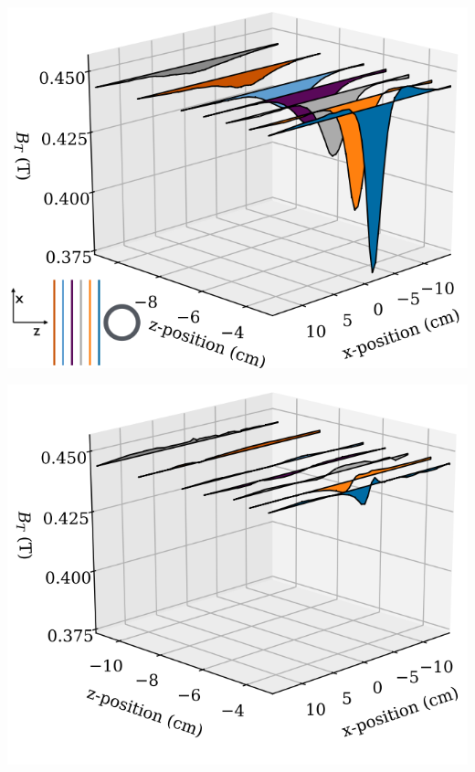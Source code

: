 \documentclass[landscape,a0paper,fontscale=0.290]{baposter} %
\begin{document}
\begin{poster}
{\begin{multicols}{2}
\begin{center}
\includegraphics[width=0.95\linewidth]{NoCloak_edit.png}
\label{fig:distortions}
\end{center}
\begin{center}
\includegraphics[width=0.9\linewidth]{WithCloak.png}
\label{fig:cloak}
\end{center}
\end{multicols}
}


\end{poster}
\end{document}
